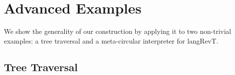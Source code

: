 \documentclass{llncs}
\begin{document}
%







\section{Advanced Examples} 

We show the generality of our construction by applying it to two non-trivial
examples: a tree traversal and a meta-circular interpreter for
{{langRevT}}.

\subsection{Tree Traversal}
\label{sec:tree}
\end{document}
